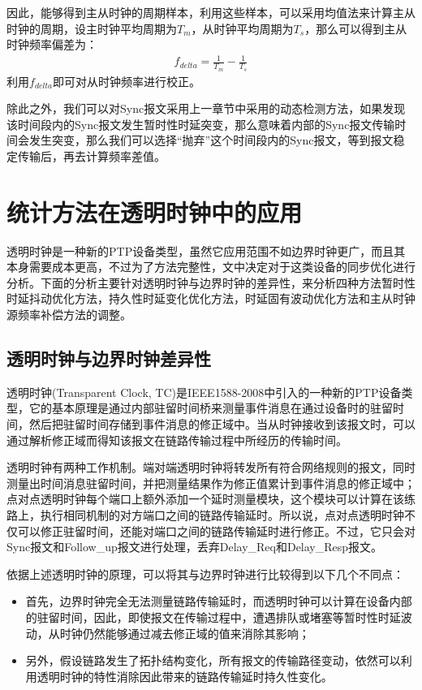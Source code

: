 因此，能够得到主从时钟的周期样本，利用这些样本，可以采用均值法来计算主从时钟的周期，设主时钟平均周期为$T_{m}$，从时钟平均周期为$T_{s}$，那么可以得到主从时钟频率偏差为：
\begin {align}
f_{delta} = \frac{1}{T_{m}} - \frac{1}{T_{s}}
\end{align}
利用$f_{delta}$即可对从时钟频率进行校正。

除此之外，我们可以对Sync报文采用上一章节中采用的动态检测方法，如果发现该时间段内的Sync报文发生暂时性时延突变，那么意味着内部的Sync报文传输时间会发生突变，那么我们可以选择“抛弃”这个时间段内的Sync报文，等到报文稳定传输后，再去计算频率差值。

\section{统计方法在透明时钟中的应用}
透明时钟是一种新的PTP设备类型，虽然它应用范围不如边界时钟更广，而且其本身需要成本更高，不过为了方法完整性，文中决定对于这类设备的同步优化进行分析。下面的分析主要针对透明时钟与边界时钟的差异性，来分析四种方法暂时性时延抖动优化方法，持久性时延变化优化方法，时延固有波动优化方法和主从时钟源频率补偿方法的调整。

\subsection{透明时钟与边界时钟差异性}
透明时钟(Transparent Clock, TC)是IEEE1588-2008中引入的一种新的PTP设备类型，它的基本原理是通过内部驻留时间桥来测量事件消息在通过设备时的驻留时间，然后把驻留时间存储到事件消息的修正域中。当从时钟接收到该报文时，可以通过解析修正域而得知该报文在链路传输过程中所经历的传输时间。

透明时钟有两种工作机制。端对端透明时钟将转发所有符合网络规则的报文，同时测量出时间消息驻留时间，并把测量结果作为修正值累计到事件消息的修正域中；点对点透明时钟每个端口上额外添加一个延时测量模块，这个模块可以计算在该练路上，执行相同机制的对方端口之间的链路传输延时。所以说，点对点透明时钟不仅可以修正驻留时间，还能对端口之间的链路传输延时进行修正。不过，它只会对Sync报文和Follow\_up报文进行处理，丢弃Delay\_Req和Delay\_Resp报文。

依据上述透明时钟的原理，可以将其与边界时钟进行比较得到以下几个不同点：
\begin{itemize}[noitemsep,topsep=0pt,parsep=0pt,partopsep=0pt]
  \item 首先，边界时钟完全无法测量链路传输延时，而透明时钟可以计算在设备内部的驻留时间，因此，即使报文在传输过程中，遭遇排队或堵塞等暂时性时延波动，从时钟仍然能够通过减去修正域的值来消除其影响；
  \item 另外，假设链路发生了拓扑结构变化，所有报文的传输路径变动，依然可以利用透明时钟的特性消除因此带来的链路传输延时持久性变化。
\end{itemize}

